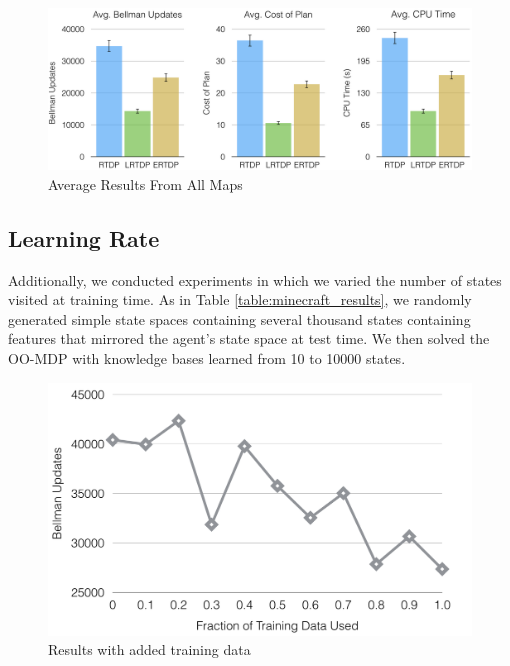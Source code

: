 \documentclass[letterpaper]{article}
\newcommand{\dnote}[1]{\textcolor{Green}{\textbf{}}}
\begin{document}
\begin{figure}[t]
\centering
\includegraphics[scale=0.25]{figures/average_results.png}%
  \caption{Average Results From All Maps}
  \label{fig:average_results}
\end{figure}

\subsection{Learning Rate}
Additionally, we conducted experiments in which we varied the number of states visited at training time. 
As in Table \ref{table:minecraft_results}, we randomly generated simple state spaces
containing several thousand states containing features that mirrored the agent's state
space at test time. We then solved the OO-MDP with knowledge bases learned from 
10 to 10000 states.\dnote{update when training complete}

\begin{figure}[H]
\centering
\includegraphics[scale=0.23]{figures/training_results.png}%
  \caption{Results with added training data}
  \label{fig:training_results}
\end{figure}
\end{document}
